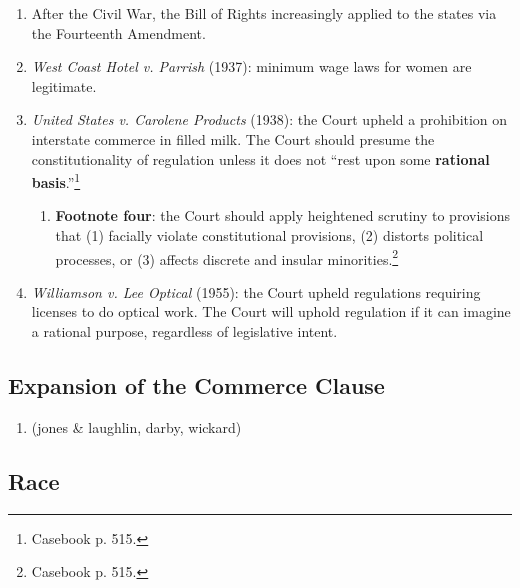 \begin{enumerate}
    \item After the Civil War, the Bill of Rights increasingly applied to the 
    states via the Fourteenth Amendment.
    \item \emph{West Coast Hotel v. Parrish} (1937): minimum wage laws for 
    women are legitimate. %
    \item \emph{United States v. Carolene Products} (1938): the Court upheld a 
    prohibition on interstate commerce in filled milk. The Court should 
    presume the constitutionality of regulation unless it does not ``rest upon 
    some \textbf{rational basis}.''\footnote{Casebook p. 515.} 
    \begin{enumerate}
        \item \textbf{Footnote four}: the Court should apply heightened 
        scrutiny to provisions that (1) facially violate constitutional 
        provisions, (2) distorts political processes, or (3) affects discrete 
        and insular minorities.\footnote{Casebook p. 515.}
    \end{enumerate}
    \item \emph{Williamson v. Lee Optical} (1955): the Court upheld 
    regulations requiring licenses to do optical work. The Court will uphold 
    regulation if it can imagine a rational purpose, regardless of legislative 
    intent.
\end{enumerate}

\subsection{Expansion of the Commerce Clause}

\begin{enumerate}
    \item (jones \& laughlin, darby, wickard) %
\end{enumerate}

\subsection{Race}

